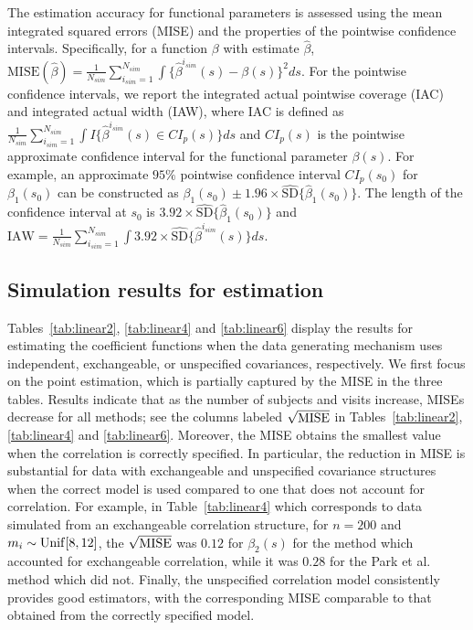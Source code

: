 \documentclass[submit]{smj}
\begin{document}
The estimation accuracy for functional parameters is assessed using the mean integrated squared errors (MISE) and the properties of the pointwise confidence intervals. Specifically, for a function $\beta$ with estimate $\hat \beta$, $\text{MISE}(\hat \beta) = \frac{1}{N_{sim}}\sum_{i_{sim} =1}^{N_{sim}} \int \{\hat\beta^{i_{sim}}(s) - \beta(s)\}^2ds $. 
For the pointwise confidence intervals, we report the integrated actual pointwise coverage (IAC) and integrated actual width (IAW), where IAC is defined as $ \frac{1}{N_{sim}} \sum_{i_{sim} =1}^{N_{sim}} \int I\{\hat\beta^{i_{sim}}(s) \in CI_p(s)\}ds$ and $CI_p(s)$ is the pointwise approximate confidence interval for the functional parameter $\beta(s)$. For example, an approximate $95\%$ pointwise confidence interval $CI_p(s_0)$ for $\beta_1(s_0)$ can be constructed as $\beta_1(s_0) \pm 1.96\times\hat{\text{SD}}\{\hat \beta_1(s_0)\}$. The length of the confidence interval at $s_0$ is $3.92\times\hat{\text{SD}}\{\hat \beta_1(s_0)\}$ and $\text{IAW} = \frac{1}{N_{sim}}\sum_{i_{sim} =1}^{N_{sim}} \int 3.92\times\hat{\text{SD}}\{\hat\beta^{i_{sim}}(s)\}ds$. 


\subsection{Simulation results for estimation}\label{subsec:sim_results}

Tables~\ref{tab:linear2}, \ref{tab:linear4} and \ref{tab:linear6} display the results for estimating the coefficient functions when the data generating mechanism uses independent, exchangeable, or unspecified covariances, respectively. We first focus on the point estimation, which is partially captured by the MISE in the three tables. Results indicate that as the number of subjects and  visits increase, MISEs decrease for all methods; see the columns labeled $\sqrt{\rm MISE}$ in Tables~\ref{tab:linear2}, \ref{tab:linear4} and \ref{tab:linear6}. Moreover, the MISE obtains the smallest value when the correlation is correctly specified. In particular, the reduction in MISE is substantial for data with exchangeable and unspecified covariance structures when the correct model is used compared to one that does not account for correlation. For example, in Table~\ref{tab:linear4} which corresponds to data simulated from an exchangeable correlation structure, for $n=200$ and $m_i\sim {\rm Unif}[8,12]$, the $\sqrt{\rm MISE}$ was $0.12$ for $\beta_2(s)$ for the method which accounted for exchangeable correlation, while it was $0.28$ for the Park et al. method which did not. Finally, the unspecified correlation model consistently provides good estimators, with the corresponding MISE comparable to that obtained from the correctly specified model.
\end{document}
